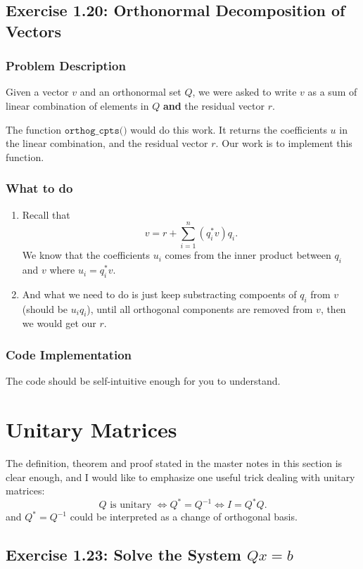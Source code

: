 \subsection*{Exercise 1.20: Orthonormal Decomposition of Vectors}
\subsubsection*{Problem Description}%
Given a vector $v$ and an orthonormal set $Q$, we were asked to write $v$ as a sum of linear combination of elements in $Q$ \textbf{and} the residual vector $r$.

\medskip
\noindent The function $\texttt{orthog\_cpts()}$ would do this work. It returns the coefficients $u$ in the linear combination, and the residual vector $r$. Our work is to implement this function.\subsubsection*{What to do}%
\begin{enumerate}
\item Recall that
  \[
    v = r + \sum_{i=1}^{n} (q^{*}_i v)q_i
  .\]
  We know that the coefficients $u_i$ comes from the inner product between $q_i$ and $v$ where $u_i = q^{*}_iv$.
\item And what we need to do is just keep substracting compoents of $q_i$ from $v$ (should be $u_iq_i$), until all orthogonal components are removed from  $v$, then we would get our  $r$.
\end{enumerate} 
\subsubsection*{Code Implementation}%

The code should be self-intuitive enough for you to understand.
\bigskip
\section{Unitary Matrices}%
The definition, theorem and proof stated in the master notes in this section is clear enough, and I would like to emphasize one useful trick dealing with unitary matrices:
\[
Q \text{ is unitary } \iff Q^{*} = Q^{-1} \iff I = Q^{*}Q 
.\] 
and $Q^{*} = Q^{-1}$ could be interpreted as a change of orthogonal basis.
\subsection*{Exercise 1.23: Solve the System $Qx=b$}
